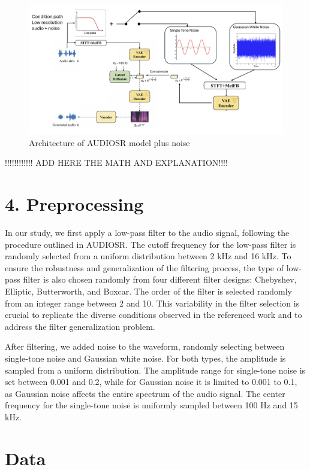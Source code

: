 \documentclass[
  ]{scrartcl}
\begin{document}
\begin{figure}
\centering
\includegraphics{images/audiosr_with_noise_architecture.png}
\caption{Architecture of AUDIOSR model plus noise}
\end{figure}

!!!!!!!!!!!! ADD HERE THE MATH AND EXPLANATION!!!!

\section{4. Preprocessing}\label{preprocessing}

In our study, we first apply a low-pass filter to the audio signal,
following the procedure outlined in AUDIOSR. The cutoff frequency for
the low-pass filter is randomly selected from a uniform distribution
between 2 kHz and 16 kHz. To ensure the robustness and generalization of
the filtering process, the type of low-pass filter is also chosen
randomly from four different filter designs: Chebyshev, Elliptic,
Butterworth, and Boxcar. The order of the filter is selected randomly
from an integer range between 2 and 10. This variability in the filter
selection is crucial to replicate the diverse conditions observed in the
referenced work and to address the filter generalization problem.

After filtering, we added noise to the waveform, randomly selecting
between single-tone noise and Gaussian white noise. For both types, the
amplitude is sampled from a uniform distribution. The amplitude range
for single-tone noise is set between 0.001 and 0.2, while for Gaussian
noise it is limited to 0.001 to 0.1, as Gaussian noise affects the
entire spectrum of the audio signal. The center frequency for the
single-tone noise is uniformly sampled between 100 Hz and 15 kHz.

\section{Data}\label{data}
\end{document}
